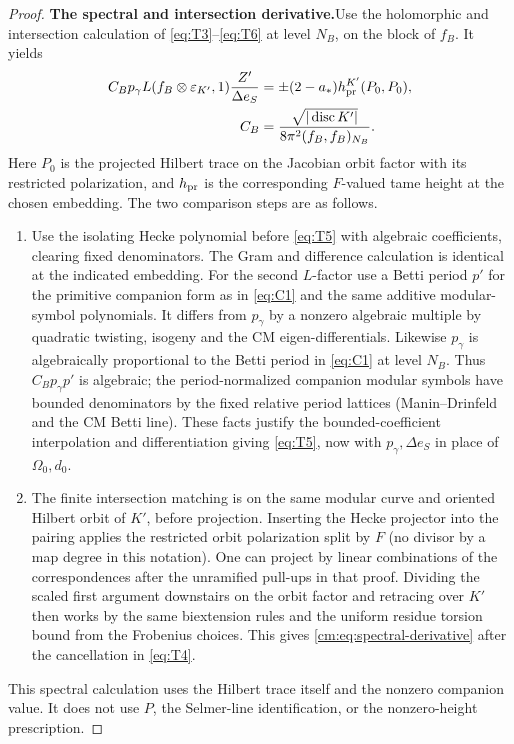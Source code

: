 \begin{proof}
\par\smallskip\noindent\textbf{The spectral and intersection derivative.}\enspace Use the holomorphic and intersection
calculation of \eqref{eq:T3}--\eqref{eq:T6} at level \(N_B\), on the block of \(f_B\). It
yields
\begin{equation}\label{cm:eq:spectral-derivative}
 \begin{split}
 C_Bp_\gamma L(f_B\otimes\varepsilon_{K'},1)
                 \frac{Z'}{\Delta e_S}
       &=\pm(2-a_*)h_{\rm pr}^{K'}(P_0,P_0),\\
 C_B&=\frac{\sqrt{|\operatorname{disc}K'|}}
                     {8\pi^2(f_B,f_B)_{N_B}}.
 \end{split}
\end{equation}
Here \(P_0\) is the projected Hilbert trace on the Jacobian orbit
factor with its restricted polarization, and \(h_{\rm pr}\) is the
corresponding \(F\)-valued tame height at the chosen embedding.
The two comparison steps are as follows.
\begin{enumerate}[label=(\roman*)]

\item Use the isolating Hecke polynomial before \eqref{eq:T5} with algebraic coefficients,
clearing fixed denominators. The Gram and difference calculation is identical at the indicated
embedding. For the second \(L\)-factor use a Betti period \(p'\) for the primitive companion
form as in \eqref{eq:C1} and the same additive modular-symbol polynomials. It differs from
\(p_\gamma\) by a nonzero algebraic multiple by quadratic twisting, isogeny and the CM
eigen-differentials. Likewise \(p_\gamma\) is algebraically proportional to the Betti period
in \eqref{eq:C1} at level \(N_B\). Thus \(C_B p_\gamma p'\) is algebraic; the
period-normalized companion modular symbols have bounded denominators by the fixed relative
period lattices (Manin--Drinfeld and the CM Betti line). These facts justify the
bounded-coefficient interpolation and differentiation giving \eqref{eq:T5}, now with
\(p_\gamma,\Delta e_S\) in place of \(\Omega_0,d_0\).
\item The finite intersection matching is on the same modular curve and oriented Hilbert orbit
of \(K'\), before projection. Inserting the Hecke projector into the pairing applies the
restricted orbit polarization split by \(F\) (no divisor by a map degree in this notation).
One can project by linear combinations of the correspondences after the unramified pull-ups in
that proof. Dividing the scaled first argument downstairs on the orbit factor and retracing
over \(K'\) then works by the same biextension rules and the uniform residue torsion bound
from the Frobenius choices. This gives \eqref{cm:eq:spectral-derivative} after the
cancellation
in \eqref{eq:T4}.
\end{enumerate}
This spectral calculation uses the Hilbert trace itself and the
nonzero companion value. It does not use \(P\), the Selmer-line
identification, or the nonzero-height prescription.


\end{proof}
